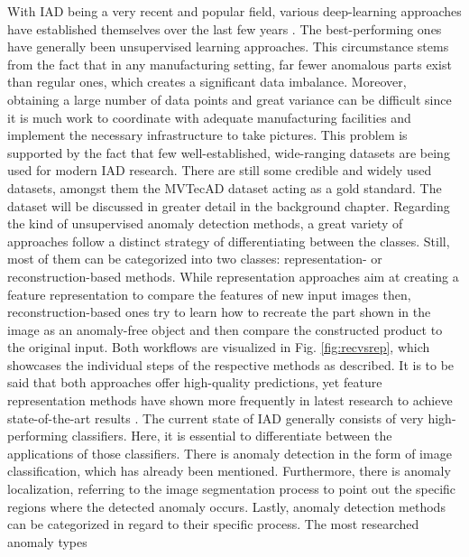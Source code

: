 With IAD being a very recent and popular field, various deep-learning approaches have established themselves over 
the last few years \cite{patchCore2022} \cite{liu2023simplenet} \cite{csflow2022} \cite{revdist2023} \cite{Zavrtanik_2021DRAEM} \cite{liu2024deep}. 
The best-performing ones have generally been unsupervised learning approaches. This circumstance stems from the fact that 
in any manufacturing setting, far fewer anomalous parts exist than regular ones, which creates a significant data imbalance. 
Moreover, obtaining a large number of data points and great variance can be difficult since it is much work to 
coordinate with adequate manufacturing facilities and implement the necessary infrastructure to take pictures. This problem is supported 
by the fact that few well-established, wide-ranging datasets are being used for modern IAD research. There are still some credible and widely used 
datasets, amongst them the MVTecAD \cite{MVTEC_Bergmann_2021} dataset acting as a gold standard. The dataset will be discussed in greater detail 
in the background chapter. Regarding the kind of unsupervised anomaly detection methods, a great variety of approaches follow a 
distinct strategy of differentiating between the classes. Still, most of them can be categorized into two classes: representation- 
or reconstruction-based methods. While representation approaches aim at creating a feature representation to compare the features of new input images then, 
reconstruction-based ones try to learn how to recreate the part shown in the image as an anomaly-free object and then compare the constructed product to the original input. 
Both workflows are visualized in Fig. \ref{fig:recvsrep}, which showcases 
the individual steps of the respective methods as described. It is to be said that both approaches offer high-quality predictions, yet 
feature representation methods have shown more frequently in latest research to achieve state-of-the-art results \cite{liu2024deep}. %
\newline
The current state of IAD generally consists of very high-performing classifiers. Here, it is essential to differentiate between the 
applications of those classifiers. There is anomaly detection in the form of image classification, which has already been mentioned. 
Furthermore, there is anomaly localization, referring to the image segmentation process to point out the specific regions where 
the detected anomaly occurs. Lastly, anomaly detection methods can be categorized in regard to their specific process. The most researched anomaly types 
